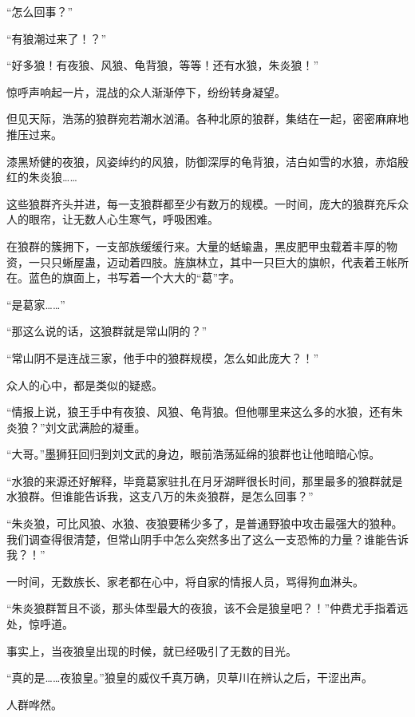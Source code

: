 
\begin{this_body}



“怎么回事？”

“有狼潮过来了！？”

“好多狼！有夜狼、风狼、龟背狼，等等！还有水狼，朱炎狼！”

惊呼声响起一片，混战的众人渐渐停下，纷纷转身凝望。

但见天际，浩荡的狼群宛若潮水汹涌。各种北原的狼群，集结在一起，密密麻麻地推压过来。

漆黑矫健的夜狼，风姿绰约的风狼，防御深厚的龟背狼，洁白如雪的水狼，赤焰殷红的朱炎狼……

这些狼群齐头并进，每一支狼群都至少有数万的规模。一时间，庞大的狼群充斥众人的眼帘，让无数人心生寒气，呼吸困难。

在狼群的簇拥下，一支部族缓缓行来。大量的蛞蝓蛊，黑皮肥甲虫载着丰厚的物资，一只只蜥屋蛊，迈动着四肢。旌旗林立，其中一只巨大的旗帜，代表着王帐所在。蓝色的旗面上，书写着一个大大的“葛”字。

“是葛家……”

“那这么说的话，这狼群就是常山阴的？”

“常山阴不是连战三家，他手中的狼群规模，怎么如此庞大？！”

众人的心中，都是类似的疑惑。

“情报上说，狼王手中有夜狼、风狼、龟背狼。但他哪里来这么多的水狼，还有朱炎狼？”刘文武满脸的凝重。

“大哥。”墨狮狂回归到刘文武的身边，眼前浩荡延绵的狼群也让他暗暗心惊。

“水狼的来源还好解释，毕竟葛家驻扎在月牙湖畔很长时间，那里最多的狼群就是水狼群。但谁能告诉我，这支八万的朱炎狼群，是怎么回事？”

“朱炎狼，可比风狼、水狼、夜狼要稀少多了，是普通野狼中攻击最强大的狼种。我们调查得很清楚，但常山阴手中怎么突然多出了这么一支恐怖的力量？谁能告诉我？！”

一时间，无数族长、家老都在心中，将自家的情报人员，骂得狗血淋头。

“朱炎狼群暂且不谈，那头体型最大的夜狼，该不会是狼皇吧？！”仲费尤手指着远处，惊呼道。

事实上，当夜狼皇出现的时候，就已经吸引了无数的目光。

“真的是……夜狼皇。”狼皇的威仪千真万确，贝草川在辨认之后，干涩出声。

人群哗然。


\end{this_body}
